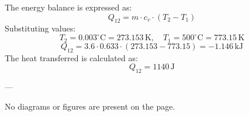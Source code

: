The energy balance is expressed as:  
\[
Q_{12} = m \cdot c_v \cdot (T_2 - T_1)
\]  
Substituting values:  
\[
T_2 = 0.003^\circ\text{C} = 273.153 \, \text{K}, \quad T_1 = 500^\circ\text{C} = 773.15 \, \text{K}
\]  
\[
Q_{12} = 3.6 \cdot 0.633 \cdot (273.153 - 773.15) = -1.146 \, \text{kJ}
\]  
The heat transferred is calculated as:  
\[
Q_{12} = 1140 \, \text{J}
\]  

---

No diagrams or figures are present on the page.